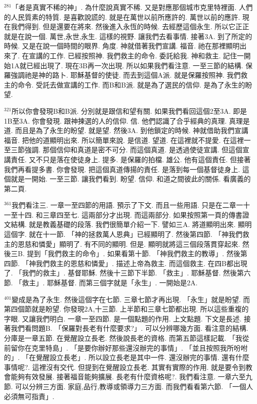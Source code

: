 \documentclass{book}
\begin{document}
$^{281}$「者是真實不稀的神」.
為什麼說真實不稀.
又是對應那個城市克里特裡面.
人們的人民質素的特質.
是喜歡說謊的.
就是在萬世以前所應許的.
萬世以前的應許.
現在我們得到.
但是還要在將來.
然後進入永恆的時候.
去經歷這個永生.
所以它正正就是在說一個.
萬世,永世,永生.
這樣的視野.
讓我們去看事情.
接著3A.
到了所定的時候.
又是在說一個時間的眼界.
角度.
神就借著我們宣講.
福音.
祂在那裡顯明出來了.
在宣講的工作.
已經按照神.
我們救主的命令.
委託給我.
神和救主.
記住一開始1A就已經出現了.
現在3B再一次出現.
所以如果我們看注意.
一至三節的結構.
保羅強調祂是神的路卜.
耶穌基督的使徒.
而去到這個A派.
就是保羅按照神.
我們救主的命令.
受託去做宣講的工作.
而B和B派.
就是為了選民的信仰.
是為了永生的盼望.

$^{321}$所以你會發現B和B派.
分別就是跟信和望有關.
如果我們看回這個2至3A.
即是1B至3A.
你會發現.
跟神揀選的人的信仰.
信.
他們認識了合乎經典的真理.
真理是道.
而且是為了永生的盼望.
就是望.
然後3A.
到他鎖定的時候.
神就借助我們宣講福音.
把他的道顯明出來.
所以簡單來說.
是信道.
望道.
在這裡就不提愛.
在這裡一至三節強調.
那個信仰和真道是密不可分.
而這個真道.
是透過使徒宣講.
但這個宣講責任.
又不只是落在使徒身上.
提多.
是保羅的拍檔.
雄公.
他有這個責任.
但接著我們再看提多書.
你會發現.
把這個真道傳揚的責任.
是落到每一個基督徒身上.
這個就是一開始.
一至三節.
讓我們看到.
盼望.
信仰.
和道之間彼此的關係.
看廣義的第二頁.

$^{361}$我們看注三.
一章一至四節的用語.
預示了下文.
而且一些用語.
只是在二章一十一至十四.
和三章四至七.
這兩部分才出現.
而這兩部分.
如果按照第一頁的傳書證文結構.
就是教義基礎的段落.
我們很簡單介紹一下.
譬如三A.
將道顯明出來.
顯明這個字.
就在十一節.
「神的拯救萬人恩典」已經顯明了.
然後第四節.
「神我們救主的恩慈和憐愛」顯明了.
有不同的顯明.
但是.
顯明就將這三個段落貫穿起來.
然後三B.
提到「我們救主的命令」.
如果看第十節.
「神我們救主的教導」.
然後第四節.
「神我們救主的恩慈和憐愛」.
描述上帝為救主.
而這個救主.
在四B都出現了.
「我們的救主」.
基督耶穌.
然後十三節下半節.
「救主」.
耶穌基督.
然後第六節.
「救主」.
耶穌基督.
而第三個字就是「永生」.
一開始是2A.

$^{401}$變成是為了永生.
然後這個字在七節.
三章七節才再出現.
「永生」就是盼望.
而第四個節就是盼望.
你發現2A,十三節.
上半節和三章七節都出現.
所以這些重複的字眼.
又讓我們明白.
一章一至四節.
是一個點題的作用.
上文點題.
下文是長述.
接著我們看問題B.
「保羅對長老有什麼要求?」.
可以分辨哪幾方面.
看注意的結構.
分庫是一章五節.
在覺醒設立長老.
然後說長老的資格.
而第五節這樣記載.
「我從前留你在克里特島」.
「是要你辦好那些還沒辦完的事情」.
「並且按照我所吩咐的」.
「在覺醒設立長老」.
所以設立長老是其中一件.
還沒辦完的事情.
還有什麼事情呢?.
這裡沒有交代.
但提到在覺醒設立長老.
其實有實際的作用.
就是要令到教會能夠有效發展.
接著福音能夠擴展.
長老有什麼資格呢?.
我們看注意.
一章六至九節.
可以分辨三方面.
家庭,品行,教導或領導力三方面.
而我們看看第六節.
「一個人必須無可指責」.
\end{document}
